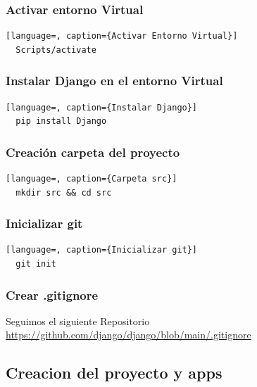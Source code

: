 \documentclass{article}
\begin{document}

  \subsubsection{Activar entorno Virtual}
  \begin{lstlisting}[language=, caption={Activar Entorno Virtual}]
  Scripts/activate
  \end{lstlisting}
  

  \subsubsection{Instalar Django en el entorno Virtual}
  \begin{lstlisting}[language=, caption={Instalar Django}]
  pip install Django
  \end{lstlisting}
  

  \subsubsection{Creación carpeta del proyecto}
  \begin{lstlisting}[language=, caption={Carpeta src}]
  mkdir src && cd src
  \end{lstlisting}
  

  \subsubsection{Inicializar git}
  \begin{lstlisting}[language=, caption={Inicializar git}]
  git init
  \end{lstlisting}
  

  \subsubsection{Crear .gitignore}
  Seguimos el siguiente Repositorio \url{https://github.com/django/django/blob/main/.gitignore}
  
  
  \subsection{Creacion del proyecto y apps}
  
\end{document}
